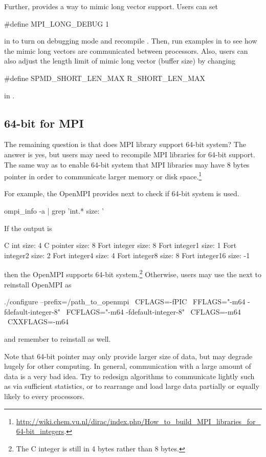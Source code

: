 Further,  provides a way to mimic long vector support.
Users can set 
\begin{Command}[title=pkg\_constant.h,language=C]
#define MPI_LONG_DEBUG 1
\end{Command}
in 
to turn on debugging mode and recompile . Then, run examples in
 to see how the mimic
long vectors are communicated between processors. Also, users can also adjust
the length limit of mimic long vector (buffer size)
by changing
\begin{Command}[title=spmd.h,language=C]
#define SPMD_SHORT_LEN_MAX R_SHORT_LEN_MAX
\end{Command}
in .


\subsection{64-bit for MPI}

The remaining question is that does MPI library support 64-bit system?
The answer is yes, but users may need to recompile MPI libraries for
64-bit support.
The same way as  to enable 64-bit system that MPI libraries
may have 8 bytes pointer in order to communicate larger memory or disk
space.\footnote{
\url{http://wiki.chem.vu.nl/dirac/index.php/How_to_build_MPI_libraries_for_64-bit_integers}.
}

For example, the OpenMPI provides next to check if 64-bit system is used.
\begin{Command}
ompi_info -a | grep 'int.* size: '
\end{Command}
If the output is
\begin{Command}
              C int size: 4
          C pointer size: 8
       Fort integer size: 8
      Fort integer1 size: 1
      Fort integer2 size: 2
      Fort integer4 size: 4
      Fort integer8 size: 8
     Fort integer16 size: -1
\end{Command}
then the OpenMPI supports 64-bit system.\footnote{
\color{red}
The C integer is still in 4 bytes rather than 8 bytes.
}
Otherwise, users may use the next to reinstall OpenMPI as
\begin{Command}
./configure --prefix=/path_to_openmpi \
            CFLAGS=-fPIC \
            FFLAGS="-m64 -fdefault-integer-8" \
            FCFLAGS="-m64 -fdefault-integer-8" \
            CFLAGS=-m64 \
            CXXFLAGS=-m64
\end{Command}
and remember to reinstall \pkg{pbdMPI} as well.

Note that 64-bit pointer may only provide larger size of data, but
may degrade hugely for other computing. In general, communication with a
large amount of data is a very bad idea. Try to redesign algorithms to
communicate lightly such as via sufficient statistics, or to rearrange and
load large data partially or equally likely to every processors.
